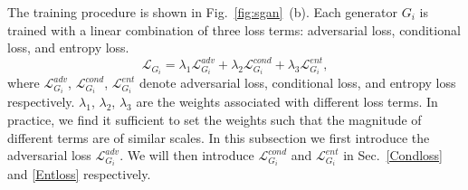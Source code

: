 \documentclass[10pt,twocolumn,letterpaper]{article}
\begin{document}

The training procedure is shown in Fig.~\ref{fig:sgan}~(b). Each generator $G_{i}$ is trained with a linear combination of three loss terms: adversarial loss, conditional loss, and entropy loss. 
\begin{equation}\mathcal{L}_{G_{i}} =\lambda_{1}\mathcal{L}_{G_{i}}^{adv} + \lambda_{2}\mathcal{L}_{G_{i}}^{cond} + \lambda_{3}\mathcal{L}_{G_{i}}^{ent},\end{equation}
where $\mathcal{L}_{G_{i}}^{adv}$, $\mathcal{L}_{G_{i}}^{cond}$, $\mathcal{L}_{G_{i}}^{ent}$ denote adversarial loss, conditional loss, and entropy loss respectively. $\lambda_{1}$, $\lambda_{2}$, $\lambda_{3}$ are the weights associated with different loss terms. In practice, we find it sufficient to set the weights such that the magnitude of different terms are of similar scales. 
In this subsection we first introduce the adversarial loss $\mathcal{L}_{G_{i}}^{adv}$. We will then introduce $\mathcal{L}_{G_{i}}^{cond}$ and $\mathcal{L}_{G_{i}}^{ent}$ in Sec.~\ref{Condloss} and  \ref{Entloss} respectively.
\end{document}

